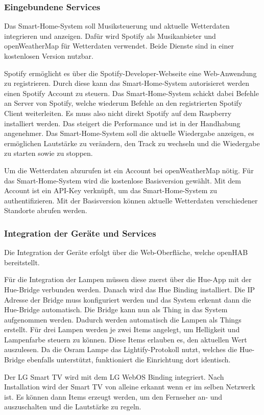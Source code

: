 		\subsubsection{Eingebundene Services}
		Das Smart-Home-System soll Musiksteuerung und aktuelle Wetterdaten  integrieren und anzeigen. Dafür wird Spotify als Musikanbieter und openWeatherMap für Wetterdaten verwendet. Beide Dienste sind in einer kostenlosen Version nutzbar.
		
		Spotify ermöglicht es über die Spotify-Developer-Webseite eine Web-Anwendung zu registrieren. Durch diese kann das Smart-Home-System autorisieret werden einen Spotify Account zu steuern. Das Smart-Home-System schickt dabei Befehle an Server von Spotify, welche wiederum Befehle an den registrierten Spotify Client weiterleiten. Es muss also nicht direkt Spotify auf dem Raspberry installiert werden. Das steigert die Performance und ist in der Handhabung angenehmer. Das Smart-Home-System soll die aktuelle Wiedergabe anzeigen, es ermöglichen Lautstärke zu verändern, den Track zu wechseln und die Wiedergabe zu starten sowie zu stoppen.
		
		Um die Wetterdaten abzurufen ist ein Account bei openWeatherMap nötig. Für das Smart-Home-System wird die kostenlose Basisversion gewählt. Mit dem Account ist ein API-Key verknüpft, um das Smart-Home-System zu authentifizieren. Mit der Basisversion können aktuelle Wetterdaten verschiedener Standorte abrufen werden.
		
		\subsubsection{Integration der Geräte und Services}
		Die Integration der Geräte erfolgt über die Web-Oberfläche, welche openHAB bereitstellt. 
		
		Für die Integration der Lampen müssen diese zuerst über die Hue-App mit der Hue-Bridge verbunden werden. Danach wird das Hue Binding installiert. Die IP Adresse der Bridge  muss konfiguriert werden und das System erkennt dann die Hue-Bridge automatisch. Die Bridge kann nun als Thing in das System aufgenommen werden. Dadurch werden automatisch die Lampen als Things erstellt. Für drei Lampen werden je zwei Items angelegt, um Helligkeit und Lampenfarbe steuern zu können. Diese Items erlauben es, den aktuellen Wert auszulesen. Da die Osram Lampe das Lightify-Protokoll nutzt, welches die Hue-Bridge ebenfalls unterstützt, funktioniert die Einrichtung dort identisch.
		
		Der LG Smart TV wird mit dem LG WebOS Binding integriert. Nach Installation wird der Smart TV von alleine erkannt wenn er im selben Netzwerk ist. Es können dann Items erzeugt werden, um den Fernseher an- und auszuschalten und die Lautstärke zu regeln.
		
